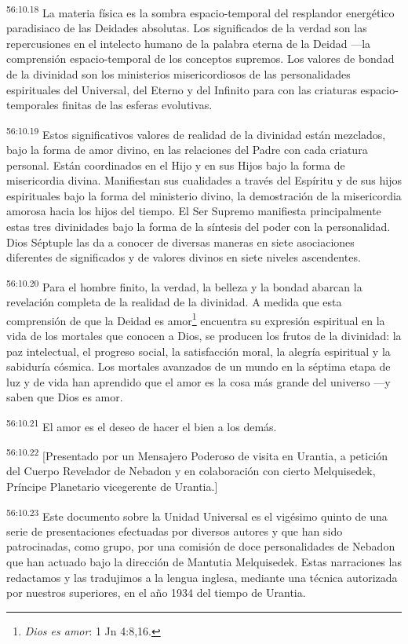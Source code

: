 \par
\textsuperscript{56:10.18} La materia física es la sombra espacio-temporal del resplandor energético paradisiaco de las Deidades absolutas. Los significados de la verdad son las repercusiones en el intelecto humano de la palabra eterna de la Deidad ---la comprensión espacio-temporal de los conceptos supremos. Los valores de bondad de la divinidad son los ministerios misericordiosos de las personalidades espirituales del Universal, del Eterno y del Infinito para con las criaturas espacio-temporales finitas de las esferas evolutivas.

\par
\textsuperscript{56:10.19} Estos significativos valores de realidad de la divinidad están mezclados, bajo la forma de amor divino, en las relaciones del Padre con cada criatura personal. Están coordinados en el Hijo y en sus Hijos bajo la forma de misericordia divina. Manifiestan sus cualidades a través del Espíritu y de sus hijos espirituales bajo la forma del ministerio divino, la demostración de la misericordia amorosa hacia los hijos del tiempo. El Ser Supremo manifiesta principalmente estas tres divinidades bajo la forma de la síntesis del poder con la personalidad. Dios Séptuple las da a conocer de diversas maneras en siete asociaciones diferentes de significados y de valores divinos en siete niveles ascendentes.

\par
\textsuperscript{56:10.20} Para el hombre finito, la verdad, la belleza y la bondad abarcan la revelación completa de la realidad de la divinidad. A medida que esta comprensión de que la Deidad es amor\footnote{\textit{Dios es amor}: 1 Jn 4:8,16.} encuentra su expresión espiritual en la vida de los mortales que conocen a Dios, se producen los frutos de la divinidad: la paz intelectual, el progreso social, la satisfacción moral, la alegría espiritual y la sabiduría cósmica. Los mortales avanzados de un mundo en la séptima etapa de luz y de vida han aprendido que el amor es la cosa más grande del universo ---y saben que Dios es amor.

\par
\textsuperscript{56:10.21} El amor es el deseo de hacer el bien a los demás.

\par
\textsuperscript{56:10.22} [Presentado por un Mensajero Poderoso de visita en Urantia, a petición del Cuerpo Revelador de Nebadon y en colaboración con cierto Melquisedek, Príncipe Planetario vicegerente de Urantia.]

\par
\textsuperscript{56:10.23} Este documento sobre la Unidad Universal es el vigésimo quinto de una serie de presentaciones efectuadas por diversos autores y que han sido patrocinadas, como grupo, por una comisión de doce personalidades de Nebadon que han actuado bajo la dirección de Mantutia Melquisedek. Estas narraciones las redactamos y las tradujimos a la lengua inglesa, mediante una técnica autorizada por nuestros superiores, en el año 1934 del tiempo de Urantia.
